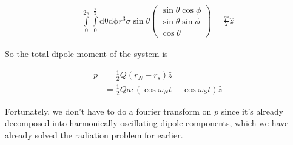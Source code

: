 \documentclass[12pt]{article}
\begin{document}
\begin{align*}
\int\limits_{0}^{2\pi}\int\limits_{0}^{\frac{\pi}{2}}\mathrm{d\theta d\phi}r^3\sigma \sin\theta
	\left(\begin{array}{c}
		\sin\theta\cos\phi \\ \sin\theta\sin\phi \\ \cos\theta
	\end{array} \right) = \frac{qr}{2}\hat{z}
\end{align*}

So the total dipole moment of the system is

\begin{align*}
p &= \frac{1}{2}Q(r_N-r_s)\hat{z} \\[4pt]
&= \frac{1}{2}Qa\epsilon(\cos\omega_Nt - \cos\omega_St)\hat{z}
\end{align*}

Fortunately, we don't have to do a fourier transform on \(p\) since it's already decomposed into harmonically oscillating dipole components, which we have already solved the radiation problem for earlier.
\end{document}
